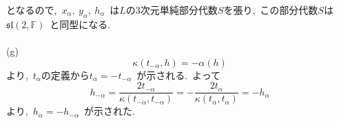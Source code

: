 \documentclass[uplatex,dvipdfmx]{jsarticle}
\begin{document}
\begin{myproof}
\begin{equation*}
    \end{equation*}
    となるので,~$x_\alpha,~y_\alpha,~h_\alpha$~は$L$の3次元単純部分代数$S$を張り,~この部分代数$S$は$\mathfrak{sl}(2,\mathbb{F})$~と同型になる.\\\\
    (g)~
    \begin{equation*}
        \kappa(t_{-\alpha},h) = -\alpha(h)
    \end{equation*}
    より,~$t_\alpha$の定義から$t_\alpha = -t_{-\alpha}$~が示される.~よって
    \begin{equation*}
        h_{-\alpha} = \frac{2t_{-\alpha}}{\kappa(t_{-\alpha}, t_{-\alpha})} = -\frac{2t_\alpha}{\kappa(t_\alpha, t_\alpha)} = -h_\alpha
    \end{equation*}
    より,~$h_\alpha = - h_{-\alpha}$~が示された.
\end{myproof}
\newpage
\end{document}
